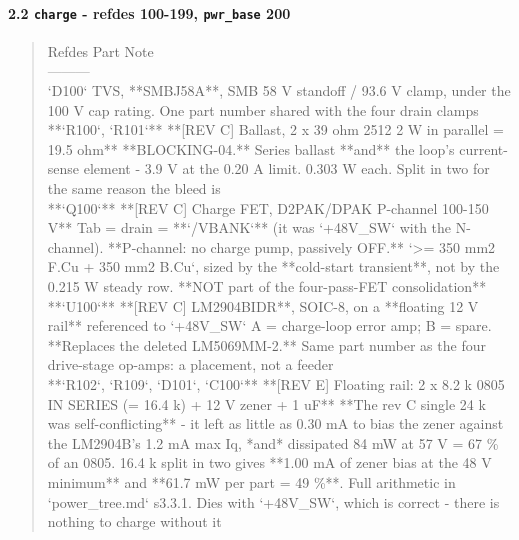 \documentclass[11pt,a4paper]{article}
\begin{document}
\paragraph*{2.2 \texttt{charge} - refdes 100-199, \texttt{pwr\_base} 200}
\begin{quote}\small\ttfamily\raggedright
\textbar{} Refdes \textbar{} Part \textbar{} Note \textbar{}\\
\textbar{}---\textbar{}---\textbar{}---\textbar{}\\
\textbar{} `D100` \textbar{} TVS, {*}{*}SMBJ58A{*}{*}, SMB \textbar{} 58 V standoff / 93.6 V clamp, under the 100 V cap rating. One part number shared with the four drain clamps \textbar{}\\
\textbar{} {*}{*}`R100`, `R101`{*}{*} \textbar{} {*}{*}{[}REV C{]} Ballast, 2 x 39 ohm 2512 2 W in parallel = 19.5 ohm{*}{*} \textbar{} {*}{*}BLOCKING-04.{*}{*} Series ballast {*}{*}and{*}{*} the loop's current-sense element - 3.9 V at the 0.20 A limit. 0.303 W each. Split in two for the same reason the bleed is \textbar{}\\
\textbar{} {*}{*}`Q100`{*}{*} \textbar{} {*}{*}{[}REV C{]} Charge FET, D2PAK/DPAK P-channel 100-150 V{*}{*} \textbar{} Tab = drain = {*}{*}`/VBANK`{*}{*} (it was `+48V\_SW` with the N-channel). {*}{*}P-channel: no charge pump, passively OFF.{*}{*} `\textgreater{}= 350 mm2 F.Cu + 350 mm2 B.Cu`, sized by the {*}{*}cold-start transient{*}{*}, not by the 0.215 W steady row. {*}{*}NOT part of the four-pass-FET consolidation{*}{*} \textbar{}\\
\textbar{} {*}{*}`U100`{*}{*} \textbar{} {*}{*}{[}REV C{]} LM2904BIDR{*}{*}, SOIC-8, on a {*}{*}floating 12 V rail{*}{*} referenced to `+48V\_SW` \textbar{} A = charge-loop error amp; B = spare. {*}{*}Replaces the deleted LM5069MM-2.{*}{*} Same part number as the four drive-stage op-amps: a placement, not a feeder \textbar{}\\
\textbar{} {*}{*}`R102`, `R109`, `D101`, `C100`{*}{*} \textbar{} {*}{*}{[}REV E{]} Floating rail: 2 x 8.2 k 0805 IN SERIES (= 16.4 k) + 12 V zener + 1 uF{*}{*} \textbar{} {*}{*}The rev C single 24 k was self-conflicting{*}{*} - it left as little as 0.30 mA to bias the zener against the LM2904B's 1.2 mA max Iq, {*}and{*} dissipated 84 mW at 57 V = 67 \% of an 0805. 16.4 k split in two gives {*}{*}1.00 mA of zener bias at the 48 V minimum{*}{*} and {*}{*}61.7 mW per part = 49 \%{*}{*}. Full arithmetic in `power\_tree.md` s3.3.1. Dies with `+48V\_SW`, which is correct - there is nothing to charge without it \textbar{}\\

\end{quote}
\end{document}
